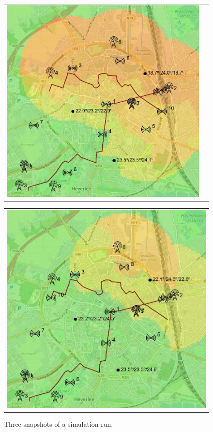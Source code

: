 \begin{figure}[h]
\begin{tabular}{ll}
         \includegraphics[scale=0.42]{figures/simACsnap2s.png}
    \end{tabular}
    \begin{tabular}{c}
         \includegraphics[scale=0.42]{figures/simACsnap3s.png} 
    \end{tabular}
    \caption[Snapshots of a simulation run (case study 2)]{Three snapshots of a simulation run.}
    \label{fig:simAC}
\end{figure}

